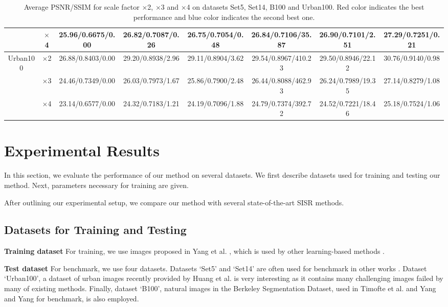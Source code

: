 \documentclass[10pt,twocolumn,letterpaper]{article}
\begin{document}
\begin{table}
\begin{center}
\begin{tabular}{ | c | c | c | c | c | c | c | c | }
 & $\times$4 & 25.96/0.6675/0.00 & 26.82/0.7087/{\color{blue}0.26} & 26.75/0.7054/0.48 & 26.84/{\color{blue}0.7106}/35.87 & {\color{blue}26.90}/0.7101/2.51 & {\color{red}27.29}/{\color{red}0.7251}/{\color{red}0.21}\\
\hline
\hline
\multirow{3}{*}{Urban100} & $\times$2 & 26.88/0.8403/0.00 & 29.20/0.8938/{\color{blue}2.96} & 29.11/0.8904/3.62 & {\color{blue}29.54}/{\color{blue}0.8967}/410.23 & 29.50/0.8946/22.12 & {\color{red}30.76}/{\color{red}0.9140}/{\color{red}0.98}\\
 & $\times$3 & 24.46/0.7349/0.00 & 26.03/0.7973/{\color{blue}1.67} & 25.86/0.7900/2.48 & {\color{blue}26.44}/{\color{blue}0.8088}/462.93 & 26.24/0.7989/19.35 & {\color{red}27.14}/{\color{red}0.8279}/{\color{red}1.08}\\
 & $\times$4 & 23.14/0.6577/0.00 & 24.32/0.7183/{\color{blue}1.21} & 24.19/0.7096/1.88 & {\color{blue}24.79}/{\color{blue}0.7374}/392.72 & 24.52/0.7221/18.46 & {\color{red}25.18}/{\color{red}0.7524}/{\color{red}1.06}\\
\hline
\end{tabular}
\caption{Average PSNR/SSIM for scale factor $\times$2, $\times$3 and $\times$4 on datasets Set5, Set14, B100 and Urban100. {\color{red}Red color} indicates the best performance and {\color{blue}blue color} indicates the second best one.}
\end{center}
\end{table}


\section{Experimental Results}
In this section, we evaluate the performance of our method on several datasets. We first describe datasets used for training and testing our method. Next, parameters necessary for training are given. 

After outlining our experimental setup, we compare our method with several state-of-the-art SISR methods. 

\subsection{Datasets for Training and Testing}
\textbf{Training dataset} For training, we use images proposed in Yang et al. \cite{yang2010image}, which is used by other learning-based methods \cite{Timofte,Timofte2013,zeyde2012single}. 

\textbf{Test dataset} For benchmark, we use four datasets. Datasets `Set5' \cite{bevilacqua2012} and `Set14' \cite{zeyde2012single} are often used for benchmark in other works \cite{Timofte,Timofte2013,Dong2014}. Dataset `Urban100', a dataset of urban images recently provided by Huang et al. \cite{Huang-CVPR-2015} is very interesting as it contains many challenging images failed by many of existing methods. Finally, dataset `B100', natural images in the Berkeley Segmentation Dataset, used in Timofte et al. \cite{Timofte} and Yang and Yang \cite{Yang2013} for benchmark, is also employed. 
\end{document}
